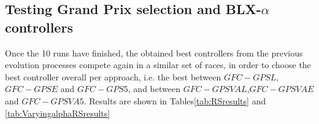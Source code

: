 \documentclass[10pt,journal,compsoc]{IEEEtran}
\begin{document}



\subsection{Testing Grand Prix selection and BLX-$\alpha$ controllers}


Once the 10 runs have finished, the obtained best controllers from the previous evolution processes compete again in a similar set of races, in order to choose the best controller overall per approach, i.e. the best between $GFC-GPSL$, $GFC-GPSE$ and $GFC-GPS5$, and between $GFC-GPSVAL$,$GFC-GPSVAE$ and $GFC-GPSVA5$.
Results are shown in Tables\ref{tab:RSresults} and \ref{tab:VaryingalphaRSresults}
\end{document}
